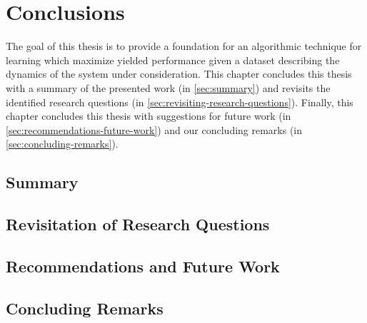 \chapter{Conclusions}
\label{ch:conclusions}

The goal of this thesis is to provide a foundation for an algorithmic technique for learning  which maximize yielded performance given a dataset describing the dynamics of the system under consideration.
This chapter concludes this thesis with a summary of the presented work (in \autoref{sec:summary}) and revisits the identified research questions (in \autoref{sec:revisiting-research-questions}).
Finally, this chapter concludes this thesis with suggestions for future work (in \autoref{sec:recommendations-future-work}) and our concluding remarks (in \autoref{sec:concluding-remarks}).


\section{Summary}
\label{sec:summary}


\section{Revisitation of Research Questions}
\label{sec:revisiting-research-questions}


\section{Recommendations and Future Work}
\label{sec:recommendations-future-work}

% 

\section{Concluding Remarks}
\label{sec:concluding-remarks}

%